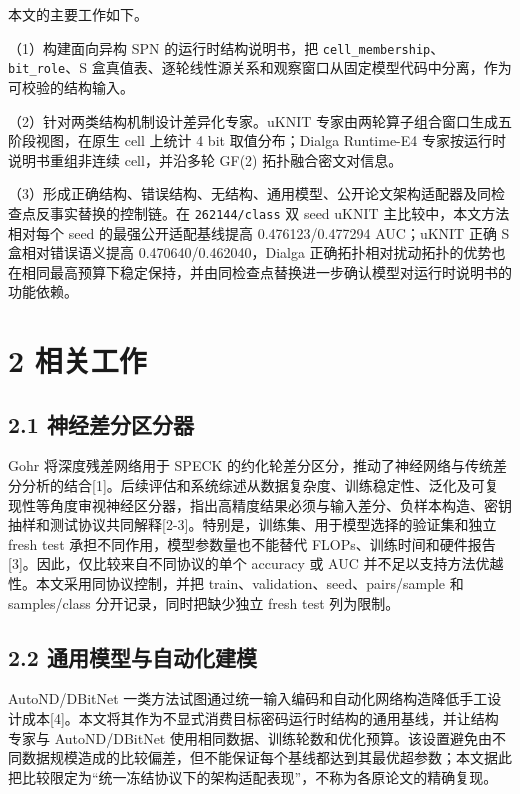 \documentclass{templates/cjc-utf8}
\begin{document}
本文的主要工作如下。

（1）构建面向异构 SPN 的运行时结构说明书，把
\texttt{cell\_membership}、\texttt{bit\_role}、S
盒真值表、逐轮线性源关系和观察窗口从固定模型代码中分离，作为可校验的结构输入。

（2）针对两类结构机制设计差异化专家。uKNIT
专家由两轮算子组合窗口生成五阶段视图，在原生 cell 上统计 4 bit
取值分布；Dialga Runtime-E4 专家按运行时说明书重组非连续 cell，并沿多轮
GF(2) 拓扑融合密文对信息。

（3）形成正确结构、错误结构、无结构、通用模型、公开论文架构适配器及同检查点反事实替换的控制链。在
\texttt{262144/class} 双 seed uKNIT 主比较中，本文方法相对每个 seed
的最强公开适配基线提高 0.476123/0.477294 AUC；uKNIT 正确 S
盒相对错误语义提高 0.470640/0.462040，Dialga
正确拓扑相对扰动拓扑的优势也在相同最高预算下稳定保持，并由同检查点替换进一步确认模型对运行时说明书的功能依赖。

\hypertarget{ux76f8ux5173ux5de5ux4f5c}{%
\section{2 相关工作}\label{ux76f8ux5173ux5de5ux4f5c}}

\hypertarget{ux795eux7ecfux5deeux5206ux533aux5206ux5668}{%
\subsection{2.1
神经差分区分器}\label{ux795eux7ecfux5deeux5206ux533aux5206ux5668}}

Gohr 将深度残差网络用于 SPECK
的约化轮差分区分，推动了神经网络与传统差分分析的结合{[}1{]}。后续评估和系统综述从数据复杂度、训练稳定性、泛化及可复现性等角度审视神经区分器，指出高精度结果必须与输入差分、负样本构造、密钥抽样和测试协议共同解释{[}2-3{]}。特别是，训练集、用于模型选择的验证集和独立
fresh test 承担不同作用，模型参数量也不能替代
FLOPs、训练时间和硬件报告{[}3{]}。因此，仅比较来自不同协议的单个
accuracy 或 AUC 并不足以支持方法优越性。本文采用同协议控制，并把
train、validation、seed、pairs/sample 和 samples/class
分开记录，同时把缺少独立 fresh test 列为限制。

\hypertarget{ux901aux7528ux6a21ux578bux4e0eux81eaux52a8ux5316ux5efaux6a21}{%
\subsection{2.2
通用模型与自动化建模}\label{ux901aux7528ux6a21ux578bux4e0eux81eaux52a8ux5316ux5efaux6a21}}

AutoND/DBitNet
一类方法试图通过统一输入编码和自动化网络构造降低手工设计成本{[}4{]}。本文将其作为不显式消费目标密码运行时结构的通用基线，并让结构专家与
AutoND/DBitNet
使用相同数据、训练轮数和优化预算。该设置避免由不同数据规模造成的比较偏差，但不能保证每个基线都达到其最优超参数；本文据此把比较限定为``统一冻结协议下的架构适配表现''，不称为各原论文的精确复现。
\end{document}
